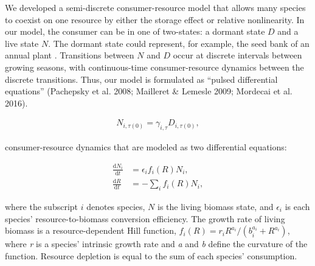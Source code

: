 \documentclass[12pt,]{article}
\begin{document}
We developed a semi-discrete consumer-resource model that allows many
species to coexist on one resource by either the storage effect or
relative nonlinearity. In our model, the consumer can be in one of
two-states: a dormant state \(D\) and a live state \(N\). The dormant
state could represent, for example, the seed bank of an annual plant
. Transitions between \(N\)
and \(D\) occur at discrete intervals between growing seasons, with
continuous-time consumer-resource dynamics between the discrete
transitions. Thus, our model is formulated as ``pulsed differential
equations'' (Pachepsky et al. 2008; Mailleret \& Lemesle 2009; Mordecai
et al. 2016).

\vspace{-3em}

\begin{align}
N_{i,\tau(0)} = \gamma_{i,\tau} D_{i,\tau(0)},
\end{align}\vspace{-3em}

\noindent {}
consumer-resource dynamics that are modeled as two differential
equations: \vspace{-3em}

\begin{align}
\frac{\text{d}N_{i}}{\text{d}t} &= \epsilon_if_{i}(R)N_{i}, \\
\frac{\text{d}R}{\text{d}t} &= - \sum\limits_{i}f_{i}(R)N_{i},
\end{align}\vspace{-3em}

\noindent where the subscript \(i\) denotes species, \(N\) is the living
biomass state, and \(\epsilon_i\) is each species' resource-to-biomass
conversion efficiency. The growth rate of living biomass is a
resource-dependent Hill function,
\(f_{i}(R) = r_{i}R^{a_{i}} / (b_{i}^{a_{i}}+R^{a_{i}})\), where
\emph{r} is a species' intrinsic growth rate and \emph{a} and \emph{b}
define the curvature of the function. Resource depletion is equal to the
sum of each species' consumption.
\end{document}
